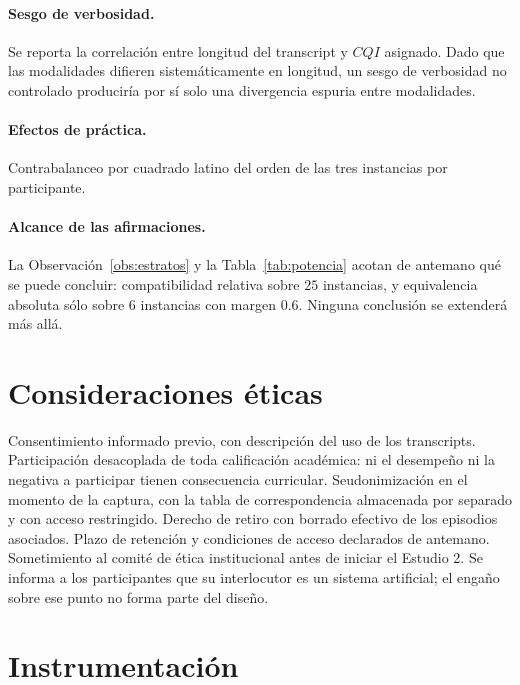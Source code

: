 \documentclass[11pt,a4paper]{article}
\theoremstyle{definition}
\theoremstyle{plain}
\theoremstyle{remark}
\begin{document}
\paragraph{Sesgo de verbosidad.} Se reporta la correlación entre longitud del
transcript y $CQI$ asignado. Dado que las modalidades difieren sistemáticamente en
longitud, un sesgo de verbosidad no controlado produciría por sí solo una
divergencia espuria entre modalidades.

\paragraph{Efectos de práctica.} Contrabalanceo por cuadrado latino del orden de
las tres instancias por participante.

\paragraph{Alcance de las afirmaciones.} La Observación~\ref{obs:estratos} y la
Tabla~\ref{tab:potencia} acotan de antemano qué se puede concluir: compatibilidad
relativa sobre $25$ instancias, y equivalencia absoluta sólo sobre $6$ instancias
con margen $0.6$. Ninguna conclusión se extenderá más allá.

\section{Consideraciones éticas}\label{sec:etica}

Consentimiento informado previo, con descripción del uso de los transcripts.
Participación desacoplada de toda calificación académica: ni el desempeño ni la
negativa a participar tienen consecuencia curricular. Seudonimización en el momento
de la captura, con la tabla de correspondencia almacenada por separado y con
acceso restringido. Derecho de retiro con borrado efectivo de los episodios
asociados. Plazo de retención y condiciones de acceso declarados de antemano.
Sometimiento al comité de ética institucional antes de iniciar el Estudio 2. Se
informa a los participantes que su interlocutor es un sistema artificial; el
engaño sobre ese punto no forma parte del diseño.

\section{Instrumentación}\label{sec:implementacion}
\end{document}
